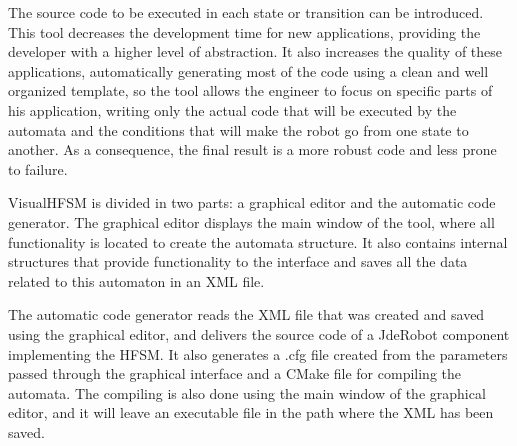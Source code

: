 \documentclass[journal,twoside]{JoPhA}
\begin{document}
The source code to be executed in each state or transition can be introduced. This tool decreases the development time for new applications, providing the developer with a higher level of abstraction. It also increases the quality of these applications, automatically generating most of the code using a clean and well organized template, so the tool allows the engineer to focus on specific parts of his application, writing only the actual code that will be executed by the automata and the conditions that will make the robot go from one state to another. As a consequence, the final result is a more robust code and less prone to failure. 



VisualHFSM is divided in two parts: a graphical editor and the automatic code generator. The graphical editor displays the main window of the tool, where all functionality is located to create the automata structure. It also contains internal structures that provide functionality to the interface and saves all the data related to this automaton in an XML file. %

The automatic code generator reads the XML file that was created and saved using the graphical editor, and delivers the source code of a JdeRobot component implementing the HFSM. It also generates a .cfg file created from the parameters passed through the graphical interface and a CMake file for compiling the automata. The compiling is also done using the main window of the graphical editor, and it will leave an executable file in the path where the XML has been saved.

\end{document}
